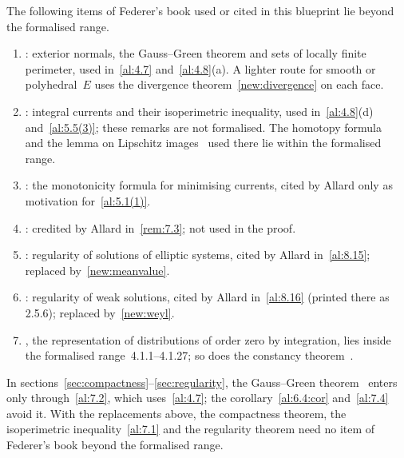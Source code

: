 \documentclass[a4paper,twoside,leqno]{article}
\begin{document}
\begin{remark}
    \label{rem:beyond}
    The following items of Federer's book used or cited in this blueprint lie beyond the
    formalised range.
    \begin{enumerate}
        \item \cite[4.5.5, 4.5.6, 4.5.11, 4.5.12]{Federer1969}: exterior normals, the
            Gauss--Green theorem and sets of locally finite perimeter, used in~\ref{al:4.7}
            and~\ref{al:4.8}(a). A lighter route for smooth or polyhedral~$E$ uses the
            divergence theorem~\ref{new:divergence} on each face.
        \item \cite[4.2, 4.2.10]{Federer1969}: integral currents and their isoperimetric
            inequality, used in~\ref{al:4.8}(d) and~\ref{al:5.5(3)}; these remarks are not
            formalised. The homotopy formula~\cite[4.1.9]{Federer1969} and the lemma on Lipschitz
            images~\cite[4.1.25]{Federer1969} used there lie within the formalised range.
        \item \cite[5.4.3]{Federer1969}: the monotonicity formula for minimising currents,
            cited by Allard only as motivation for~\ref{al:5.1(1)}.
        \item \cite[4.5.9(18)]{Federer1969}: credited by Allard in~\ref{rem:7.3}; not used in
            the proof.
        \item \cite[5.2.5]{Federer1969}: regularity of solutions of elliptic systems, cited by
            Allard in~\ref{al:8.15}; replaced by~\ref{new:meanvalue}.
        \item \cite[5.2.6]{Federer1969}: regularity of weak solutions, cited by Allard
            in~\ref{al:8.16} (printed there as 2.5.6); replaced by~\ref{new:weyl}.
        \item \cite[4.1.5]{Federer1969}, the representation of distributions of order zero by
            integration, lies inside the formalised range~4.1.1--4.1.27; so does the constancy
            theorem~\cite[4.1.4]{Federer1969}.
    \end{enumerate}
    In sections~\ref{sec:compactness}--\ref{sec:regularity}, the Gauss--Green
    theorem~\cite[4.5.6, 4.5.12]{Federer1969} enters only through~\ref{al:7.2}, which
    uses~\ref{al:4.7}; the corollary~\ref{al:6.4:cor} and~\ref{al:7.4} avoid it. With the
    replacements above, the compactness theorem, the isoperimetric inequality~\ref{al:7.1} and the
    regularity theorem need no item of Federer's book beyond the formalised range.
\end{remark}



\end{document}
